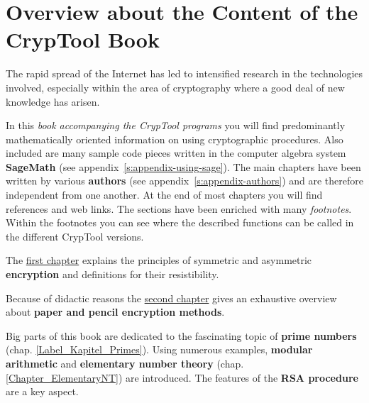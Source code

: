 
\clearpage{}

\chapter*{Overview about the Content of the CrypTool Book}  

\parskip 4pt
The rapid spread of the Internet has led to intensified research in the
technologies involved, especially within the area of cryptography where a good
deal of new knowledge has arisen.

In this {\em book accompanying the CrypTool programs} 
you will find predominantly mathematically oriented information on using
cryptographic procedures. Also included are many sample code pieces written in the
computer algebra system {\bf SageMath} (see appendix~\ref{s:appendix-using-sage}).
The main chapters have been written by various {\bf authors}
(see appendix~\ref{s:appendix-authors}) %
and are therefore independent from one another. At the end of most chapters
you will find references and web links.
The sections have been enriched with many {\em footnotes}. Within the footnotes
you can see where the described functions can be called in the different CrypTool
versions.

The \hyperlink{Kapitel_1}{first chapter} explains the principles of symmetric
and asymmetric {\bf encryption} and definitions for their resistibility.

Because of didactic reasons the \hyperlink{Kapitel_PaperandPencil}
{second chapter} gives an exhaustive overview
about {\bf paper and pencil encryption methods}.

Big parts of this book are dedicated to the fascinating topic of 
{\bf prime numbers} (chap. \ref{Label_Kapitel_Primes}).
Using numerous examples, {\bf modular arithmetic} and 
{\bf elementary number theory} (chap. \ref{Chapter_ElementaryNT})
are introduced. The features of the {\bf RSA procedure} are a key aspect.

